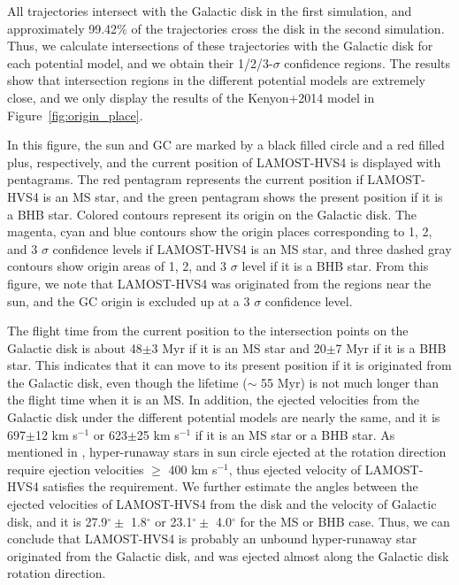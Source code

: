 \documentclass[iop, aj]{emulateapj}
\begin{document}
All trajectories intersect with the Galactic disk in the first simulation, and approximately 99.42$\%$ of the trajectories cross the disk in the second simulation. Thus, we calculate intersections of these trajectories with the Galactic disk for each potential model, and we obtain their 1/2/3-$\sigma$ confidence regions. The results show that intersection regions in the different potential models are extremely close, and we only display the results of the Kenyon+2014 model in Figure~\ref{fig:origin_place}.

In this figure, the sun and GC are marked by a black filled circle and a red filled plus, respectively, and the current position of LAMOST-HVS4 is displayed with pentagrams. The red pentagram represents the current position if LAMOST-HVS4 is an MS star, and the green pentagram shows the present position if it is a BHB star. Colored contours represent its origin on the Galactic disk. The magenta, cyan and blue contours show the origin places corresponding to 1, 2, and 3 $\sigma$ confidence levels if LAMOST-HVS4 is an MS star, and three dashed gray contours show origin areas of 1, 2, and 3 $\sigma$ level if it is a BHB star. From this figure, we note that LAMOST-HVS4 was originated from the regions near the sun, and the GC origin is excluded up at a 3 $\sigma$ confidence level.

The flight time from the current position to the intersection points on the Galactic disk is about 48$\pm$3 Myr if it is an MS star and 20$\pm$7 Myr if it is a BHB star. This indicates that it can move to its present position if it is originated from the Galactic disk, even though the lifetime ($\sim$ 55 Myr) is not much longer than the flight time when it is an MS. In addition, the ejected velocities from the Galactic disk under the different potential models are nearly the same, and it is 697$\pm$12 km s$^{-1}$ or 623$\pm$25 km s$^{-1}$ if it is an MS star or a BHB star. As mentioned in \citet{2015ARA&A..53...15B}, hyper-runaway stars in sun circle ejected at the rotation direction require ejection velocities $\geq$ 400 km s$^{-1}$, thus ejected velocity of LAMOST-HVS4 satisfies the requirement. We further estimate the angles between the ejected velocities of LAMOST-HVS4 from the disk and the velocity of Galactic disk, and it is 27.9$^{\circ} \pm$ 1.8$^{\circ}$ or 23.1$^{\circ} \pm$ 4.0$^{\circ}$ for the MS or BHB case. Thus, we can conclude that LAMOST-HVS4 is probably an unbound hyper-runaway star originated from the Galactic disk, and was ejected almost along the Galactic disk rotation direction.
\end{document}
